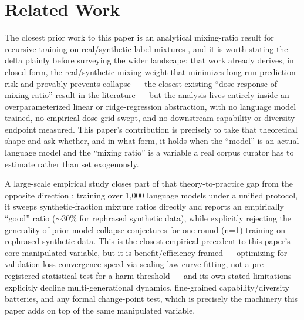 \documentclass[11pt]{article}
\begin{document}
\section{Related Work}

The closest prior work to this paper is an analytical mixing-ratio result for recursive training on real/synthetic label mixtures \citep{PreventCollapseMixing}, and it is worth stating the delta plainly before surveying the wider landscape: that work already derives, in closed form, the real/synthetic mixing weight that minimizes long-run prediction risk and provably prevents collapse --- the closest existing ``dose-response of mixing ratio'' result in the literature --- but the analysis lives entirely inside an overparameterized linear or ridge-regression abstraction, with no language model trained, no empirical dose grid swept, and no downstream capability or diversity endpoint measured. This paper's contribution is precisely to take that theoretical shape and ask whether, and in what form, it holds when the ``model'' is an actual language model and the ``mixing ratio'' is a variable a real corpus curator has to estimate rather than set exogenously.

A large-scale empirical study closes part of that theory-to-practice gap from the opposite direction \citep{DemystifySynthPretrain}: training over 1,000 language models under a unified protocol, it sweeps synthetic-fraction mixture ratios directly and reports an empirically ``good'' ratio ($\sim$30\% for rephrased synthetic data), while explicitly rejecting the generality of prior model-collapse conjectures for one-round (n=1) training on rephrased synthetic data. This is the closest empirical precedent to this paper's core manipulated variable, but it is benefit/efficiency-framed --- optimizing for validation-loss convergence speed via scaling-law curve-fitting, not a pre-registered statistical test for a harm threshold --- and its own stated limitations explicitly decline multi-generational dynamics, fine-grained capability/diversity batteries, and any formal change-point test, which is precisely the machinery this paper adds on top of the same manipulated variable.
\end{document}
